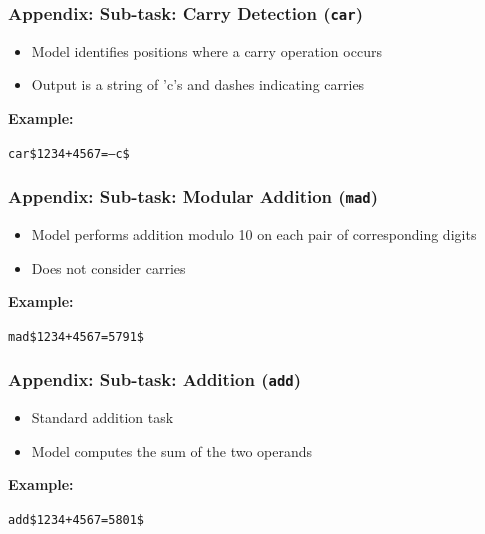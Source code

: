 \documentclass[14pt,aspectratio=169]{beamer}
\theoremstyle{remark}
\begin{document}
\begin{frame}
    \frametitle{Appendix: Sub-task: Carry Detection (\texttt{car})}
    \begin{itemize}
        \item Model identifies positions where a carry operation occurs
        \item Output is a string of 'c's and dashes indicating carries
    \end{itemize}
    \vspace{0.5em}
    \textbf{Example:}
    \begin{center}
        \texttt{car\$1234+4567=---c\$}
    \end{center}
\end{frame}

\begin{frame}
    \frametitle{Appendix: Sub-task: Modular Addition (\texttt{mad})}
    \begin{itemize}
        \item Model performs addition modulo 10 on each pair of corresponding digits
        \item Does not consider carries
    \end{itemize}
    \vspace{0.5em}
    \textbf{Example:}
    \begin{center}
        \texttt{mad\$1234+4567=5791\$}
    \end{center}
\end{frame}

\begin{frame}
    \frametitle{Appendix: Sub-task: Addition (\texttt{add})}
    \begin{itemize}
        \item Standard addition task
        \item Model computes the sum of the two operands
    \end{itemize}
    \vspace{0.5em}
    \textbf{Example:}
    \begin{center}
        \texttt{add\$1234+4567=5801\$}
    \end{center}
\end{frame}
\end{document}
